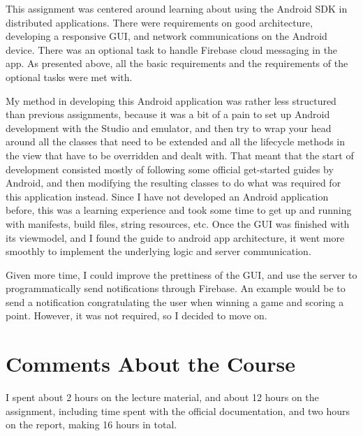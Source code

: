 \documentclass[a4paper]{scrartcl}
\begin{document}
This assignment was centered around learning about using the Android SDK in distributed applications. There were requirements on good architecture, developing a responsive GUI, and network communications on the Android device. There was an optional task to handle Firebase cloud messaging in the app. As presented above, all the basic requirements and the requirements of the optional tasks were met with.

My method in developing this Android application was rather less structured than previous assignments, because it was a bit of a pain to set up Android development with the Studio and emulator, and then try to wrap your head around all the classes that need to be extended and all the lifecycle methods in the view that have to be overridden and dealt with. That meant that the start of development consisted mostly of following some official get-started guides by Android, and then modifying the resulting classes to do what was required for this application instead. Since I have not developed an Android application before, this was a learning experience and took some time to get up and running with manifests, build files, string resources, etc. Once the GUI was finished with its viewmodel, and I found the guide to android app architecture, it went more smoothly to implement the underlying logic and server communication.

Given more time, I could improve the prettiness of the GUI, and use the server to programmatically send notifications through Firebase. An example would be to send a notification congratulating the user when winning a game and scoring a point. However, it was not required, so I decided to move on.

\section{Comments About the Course}

I spent about 2 hours on the lecture material, and about 12 hours on the assignment, including time spent with the official documentation, and two hours on the report, making 16 hours in total.
\end{document}
